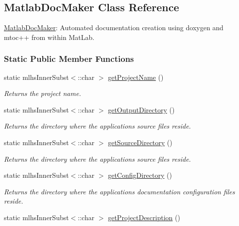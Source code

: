 \hypertarget{class_matlab_doc_maker}{}\subsection{Matlab\+Doc\+Maker Class Reference}
\label{class_matlab_doc_maker}


\hyperlink{class_matlab_doc_maker}{Matlab\+Doc\+Maker}\+: Automated documentation creation using doxygen and mtoc++ from within Mat\+Lab.  


\subsubsection*{Static Public Member Functions}
\begin{DoxyCompactItemize}
\item 
static mlhs\+Inner\+Subst$<$\+::char $>$ \hyperlink{class_matlab_doc_maker_af8bd1d74d403b7e81831a0b0f7351e72}{get\+Project\+Name} ()
\begin{DoxyCompactList}\small\item\em Returns the project name. \end{DoxyCompactList}\item 
static mlhs\+Inner\+Subst$<$\+::char $>$ \hyperlink{class_matlab_doc_maker_a8a464e2b3bd76625f637dedbedbd1ea0}{get\+Output\+Directory} ()
\begin{DoxyCompactList}\small\item\em Returns the directory where the applications source files reside. \end{DoxyCompactList}\item 
static mlhs\+Inner\+Subst$<$\+::char $>$ \hyperlink{class_matlab_doc_maker_a70806462467982623dd808caef7b6b03}{get\+Source\+Directory} ()
\begin{DoxyCompactList}\small\item\em Returns the directory where the applications source files reside. \end{DoxyCompactList}\item 
static mlhs\+Inner\+Subst$<$\+::char $>$ \hyperlink{class_matlab_doc_maker_ac201c45057310993a26a114403254c41}{get\+Config\+Directory} ()
\begin{DoxyCompactList}\small\item\em Returns the directory where the applications documentation configuration files reside. \end{DoxyCompactList}\item 
static mlhs\+Inner\+Subst$<$\+::char $>$ \hyperlink{class_matlab_doc_maker_add46ecca31bbef99fba8ba6dc177e05a}{get\+Project\+Description} ()

\end{DoxyCompactItemize}
